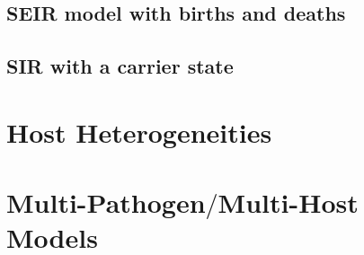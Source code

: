 \documentclass[a4paper,10pt,twoside]{book}
\begin{document}
\section{ SEIR model with births and deaths}\label{ SEIR model with births and deaths}\section{ SIR with a carrier state}\label{ SIR with a carrier state}\chapter{ Host Heterogeneities}\label{ Host Heterogeneities}\chapter{ Multi-Pathogen$/$Multi-Host Models}\label{ Multi-Pathogen/Multi-Host Models}




\printindex
\end{document}
